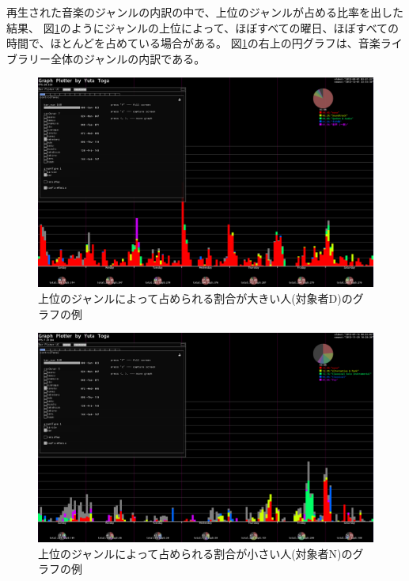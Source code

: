 \documentclass[a4paper, 11pt, onecolumn, report]{jsarticle}
\begin{document}

再生された音楽のジャンルの内訳の中で、上位のジャンルが占める比率を出した結果、
図\ref{topFive_heavy}のようにジャンルの上位によって、ほぼすべての曜日、ほぼすべての時間で、ほとんどを占めている場合がある。
図\ref{topFive_heavy}の右上の円グラフは、音楽ライブラリー全体のジャンルの内訳である。


\begin{figure}[h]
\begin{center}
\includegraphics[width=14cm]{topFive_heavy.png}
\caption{上位のジャンルによって占められる割合が大きい人(対象者D)のグラフの例}
\label{topFive_heavy}
\end{center}
\end{figure}

\begin{figure}[h]
\begin{center}
\includegraphics[width=14cm]{topFive_light.png}
\caption{上位のジャンルによって占められる割合が小さい人(対象者N)のグラフの例}
\label{topFive_light}
\end{center}
\end{figure}
\end{document}
